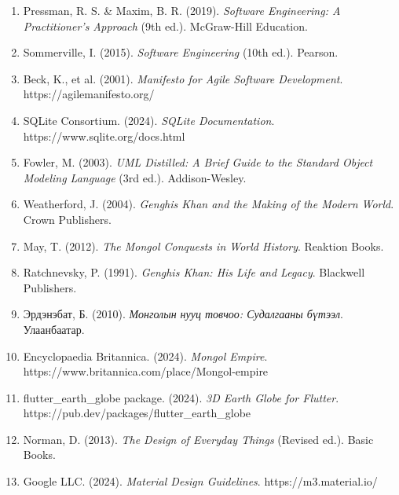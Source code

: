 \begin{enumerate}
\item Pressman, R. S. \& Maxim, B. R. (2019). \textit{Software Engineering: A Practitioner's Approach} (9th ed.). McGraw-Hill Education.

\item Sommerville, I. (2015). \textit{Software Engineering} (10th ed.). Pearson.

\item Beck, K., et al. (2001). \textit{Manifesto for Agile Software Development}. https://agilemanifesto.org/

\item SQLite Consortium. (2024). \textit{SQLite Documentation}. https://www.sqlite.org/docs.html

\item Fowler, M. (2003). \textit{UML Distilled: A Brief Guide to the Standard Object Modeling Language} (3rd ed.). Addison-Wesley.

\item Weatherford, J. (2004). \textit{Genghis Khan and the Making of the Modern World}. Crown Publishers.

\item May, T. (2012). \textit{The Mongol Conquests in World History}. Reaktion Books.

\item Ratchnevsky, P. (1991). \textit{Genghis Khan: His Life and Legacy}. Blackwell Publishers.

\item Эрдэнэбат, Б. (2010). \textit{Монголын нууц товчоо: Судалгааны бүтээл}. Улаанбаатар.

\item Encyclopaedia Britannica. (2024). \textit{Mongol Empire}. https://www.britannica.com/place/Mongol-empire

\item flutter\_earth\_globe package. (2024). \textit{3D Earth Globe for Flutter}. https://pub.dev/packages/flutter\_earth\_globe

\item Norman, D. (2013). \textit{The Design of Everyday Things} (Revised ed.). Basic Books.

\item Google LLC. (2024). \textit{Material Design Guidelines}. https://m3.material.io/

\end{enumerate}
